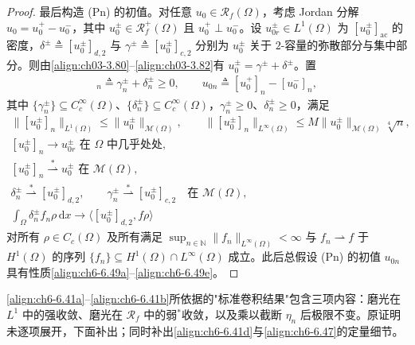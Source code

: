 \documentclass[../../main.tex]{subfiles}%
\begin{document}
\begin{proof}
最后构造 (Pn) 的初值。对任意 $u_0\in\mathscr{R}_f(\Omega)$，考虑 Jordan 分解 $u_0=u^+_0-u^-_0$，其中 $u^\pm_0\in\mathscr{R}^+_f(\Omega)$ 且 $u^+_0\perp u^-_0$。设 $u^\pm_{0r}\in L^1(\Omega)$ 为 $[u^\pm_0]_{\mathrm{ac}}$ 的密度，$\delta^\pm\triangleq[u^\pm_0]_{d,2}$ 与 $\gamma^\pm\triangleq[u^\pm_0]_{c,2}$ 分别为 $u^\pm_0$ 关于 $2$-容量的弥散部分与集中部分。则由\eqref{align:ch03-3.80}--\eqref{align:ch03-3.82}有 $u^\pm_0=\gamma^\pm+\delta^\pm$。置
\begin{align}
[u^\pm_0]_n\triangleq\gamma^\pm_n+\delta^\pm_n\geqslant0,\qquad
u_{0n}\triangleq[u^+_0]_n-[u^-_0]_n, \label{align:ch6-6.48}
\end{align}
其中 $\{\gamma^\pm_n\}\subseteq C^\infty_c(\Omega)$、$\{\delta^\pm_n\}\subseteq C^\infty_c(\Omega)$，$\gamma^\pm_n\geqslant0$、$\delta^\pm_n\geqslant0$，满足
\begin{align}
\|[u^\pm_0]_n\|_{L^1(\Omega)}\leqslant\|u^\pm_0\|_{\mathscr{M}(\Omega)},\qquad
\|[u^\pm_0]_n\|_{L^\infty(\Omega)}\leqslant M\|u^\pm_0\|_{\mathscr{M}(\Omega)}\sqrt[4]{n}, \label{align:ch6-6.49a}\\
[u^\pm_0]_n\to u^\pm_{0r}\text{ 在 }\Omega\text{ 中几乎处处}, \label{align:ch6-6.49b}\\
[u^\pm_0]_n\stackrel{*}{\rightharpoonup}u^\pm_0\text{ 在 }\mathscr{M}(\Omega), \label{align:ch6-6.49c}\\
\delta^\pm_n\stackrel{*}{\rightharpoonup}[u^\pm_0]_{d,2},\qquad
\gamma^\pm_n\stackrel{*}{\rightharpoonup}[u^\pm_0]_{c,2}
\quad\text{在 }\mathscr{M}(\Omega), \label{align:ch6-6.49d}\\
\int_\Omega\delta^\pm_nf_n\rho\,\mathrm{d}x\to\langle[u^\pm_0]_{d,2},f\rho\rangle \label{align:ch6-6.49e}
\end{align}
对所有 $\rho\in C_c(\Omega)$ 及所有满足 $\sup_{n\in\mathbb{N}}\|f_n\|_{L^\infty(\Omega)}<\infty$ 与 $f_n\rightharpoonup f$ 于 $H^1(\Omega)$ 的序列 $\{f_n\}\subseteq H^1(\Omega)\cap L^\infty(\Omega)$ 成立。此后总假设 (Pn) 的初值 $u_{0n}$ 具有性质\eqref{align:ch6-6.49a}--\eqref{align:ch6-6.49e}。
\end{proof}

\eqref{align:ch6-6.41a}--\eqref{align:ch6-6.41b}所依据的"标准卷积结果"包含三项内容：磨光在 $L^1$ 中的强收敛、磨光在 $\mathscr{R}_f$ 中的弱$^*$收敛，以及乘以截断 $\eta_n$ 后极限不变。原证明未逐项展开，下面补出；同时补出\eqref{align:ch6-6.41d}与\eqref{align:ch6-6.47}的定量细节。
\end{document}
